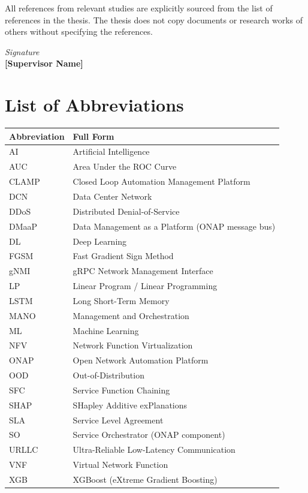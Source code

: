 \documentclass[12pt, a4paper, reqno, oneside]{book}
\begin{document}
All references from relevant studies are explicitly sourced from the list of references in the thesis. The thesis does not copy documents or research works of others without specifying the references.

\begin{flushright}
{\it Signature}\\[2cm]
{\bf [Supervisor Name]}
\end{flushright}

\newpage

\chapter*{List of Abbreviations}
\vspace{20pt}

\begin{table}[H]
\centering
\begin{tabular}{|m{2.5cm}|m{9cm}|}
\hline
\textbf{Abbreviation} & \textbf{Full Form} \\ \hline
AI    & Artificial Intelligence \\ \hline
AUC   & Area Under the ROC Curve \\ \hline
CLAMP & Closed Loop Automation Management Platform \\ \hline
DCN   & Data Center Network \\ \hline
DDoS  & Distributed Denial-of-Service \\ \hline
DMaaP & Data Management as a Platform (ONAP message bus) \\ \hline
DL    & Deep Learning \\ \hline
FGSM  & Fast Gradient Sign Method \\ \hline
gNMI  & gRPC Network Management Interface \\ \hline
LP    & Linear Program / Linear Programming \\ \hline
LSTM  & Long Short-Term Memory \\ \hline
MANO  & Management and Orchestration \\ \hline
ML    & Machine Learning \\ \hline
NFV   & Network Function Virtualization \\ \hline
ONAP  & Open Network Automation Platform \\ \hline
OOD   & Out-of-Distribution \\ \hline
SFC   & Service Function Chaining \\ \hline
SHAP  & SHapley Additive exPlanations \\ \hline
SLA   & Service Level Agreement \\ \hline
SO    & Service Orchestrator (ONAP component) \\ \hline
URLLC & Ultra-Reliable Low-Latency Communication \\ \hline
VNF   & Virtual Network Function \\ \hline
XGB   & XGBoost (eXtreme Gradient Boosting) \\ \hline
\end{tabular}
\end{table}
\end{document}
